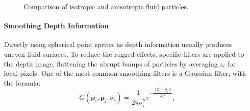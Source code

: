 \documentclass[times,twocolumn,final]{elsarticle}
\begin{document}
\begin{figure}[htbp]
    \centering
    \caption{Comparison of isotropic and anisotropic fluid particles.}
    \label{fig:figure3}
\end{figure}

\paragraph{Smoothing Depth Information}
Directly using spherical point sprites as depth information usually produces uneven fluid surfaces. To reduce the rugged effects, specific filters are applied to the depth image, flattening the abrupt bumps of particles by averaging $z_i$ for local pixels. One of the most common smoothing filters is a Gaussian filter\cite{ref:ref24}, with the formula:
\begin{equation}
    G\left({\mathbf{p}}_i, {\mathbf{p}}_j, \sigma_i\right)
    =
    \frac{1}{2 \pi \sigma_i^{2}} e^{-\frac{ \| {\mathbf{p}}_i - {\mathbf{p}}_j \| }{2 \sigma_i^{2}}}, 
\label{con:equ2}
\end{equation}
\end{document}
